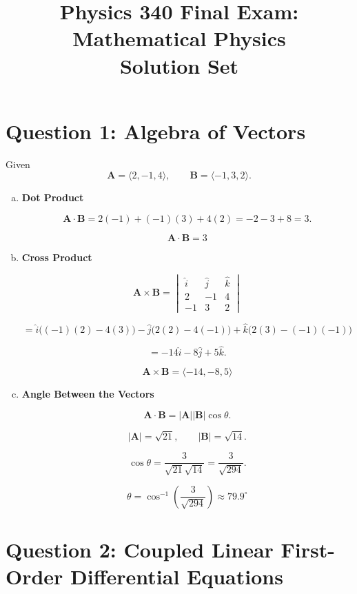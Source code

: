 \documentclass[12pt]{article}
\begin{document}
\title{Physics 340 Final Exam: Mathematical Physics \\ Solution Set}
\author{}
\date{}
\maketitle

\section*{Question 1: Algebra of Vectors}

Given
\[
\mathbf{A}=\langle 2,-1,4\rangle,
\qquad
\mathbf{B}=\langle -1,3,2\rangle.
\]

\begin{enumerate}[a)]

\item \textbf{Dot Product}

\[
\mathbf{A}\cdot\mathbf{B}
=2(-1)+(-1)(3)+4(2)
=-2-3+8=3.
\]

\[
\boxed{\mathbf{A}\cdot\mathbf{B}=3}
\]

\item \textbf{Cross Product}

\[
\mathbf{A}\times\mathbf{B}
=
\begin{vmatrix}
\hat{i}&\hat{j}&\hat{k}\\
2&-1&4\\
-1&3&2
\end{vmatrix}
\]

\[
=
\hat{i}\bigl((-1)(2)-4(3)\bigr)
-\hat{j}\bigl(2(2)-4(-1)\bigr)
+\hat{k}\bigl(2(3)-(-1)(-1)\bigr)
\]

\[
=
-14\hat{i}-8\hat{j}+5\hat{k}.
\]

\[
\boxed{\mathbf{A}\times\mathbf{B}=\langle -14,-8,5\rangle}
\]

\item \textbf{Angle Between the Vectors}

\[
\mathbf{A}\cdot\mathbf{B}=|\mathbf{A}||\mathbf{B}|\cos\theta.
\]

\[
|\mathbf{A}|=\sqrt{21},
\qquad
|\mathbf{B}|=\sqrt{14}.
\]

\[
\cos\theta=\frac{3}{\sqrt{21}\sqrt{14}}
=\frac{3}{\sqrt{294}}.
\]

\[
\boxed{\theta=\cos^{-1}\!\left(\frac{3}{\sqrt{294}}\right)\approx79.9^\circ}
\]

\end{enumerate}

\newpage

\section*{Question 2: Coupled Linear First-Order Differential Equations}
\end{document}

